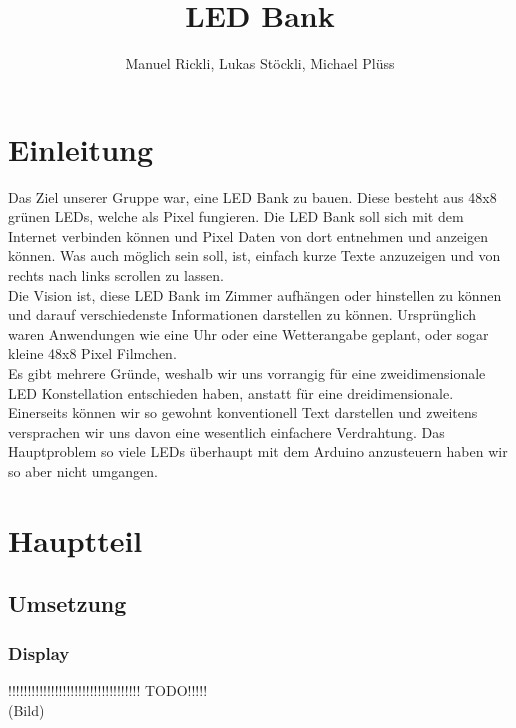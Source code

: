 \documentclass[10pt,a4paper]{article}
\author{Manuel Rickli, Lukas Stöckli, Michael Plüss}
\title{LED Bank}
\begin{document}
\maketitle

\section{Einleitung}

Das Ziel unserer Gruppe war, eine LED Bank zu bauen. Diese besteht aus 48x8 grünen LEDs, welche als Pixel fungieren. Die LED Bank soll sich mit dem Internet verbinden können und Pixel Daten von dort entnehmen und anzeigen können. Was auch möglich sein soll, ist, einfach kurze Texte anzuzeigen und von rechts nach links scrollen zu lassen.\\
Die Vision ist, diese LED Bank im Zimmer aufhängen oder hinstellen zu können und darauf verschiedenste Informationen darstellen zu können. Ursprünglich waren Anwendungen wie eine Uhr oder eine Wetterangabe geplant, oder sogar kleine 48x8 Pixel Filmchen.\\
Es gibt mehrere Gründe, weshalb wir uns vorrangig für eine zweidimensionale LED Konstellation entschieden haben, anstatt für eine dreidimensionale. Einerseits können wir so gewohnt konventionell Text darstellen und zweitens versprachen wir uns davon eine wesentlich einfachere Verdrahtung. Das Hauptproblem so viele LEDs überhaupt mit dem Arduino anzusteuern haben wir so aber nicht umgangen.\\

\section{Hauptteil}

\subsection{Umsetzung}

\subsubsection{Display}

!!!!!!!!!!!!!!!!!!!!!!!!!!!!!!!!!! TODO!!!!!\\
(Bild)\\\\
\end{document}
